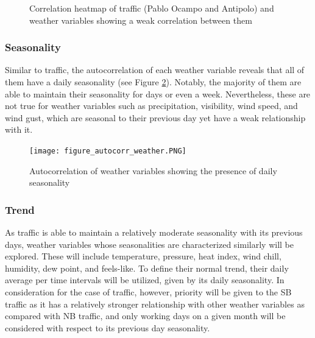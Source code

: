 \begin{figure}[!t]
  \centering
  \captionsetup{justification=centering}
  \caption{Correlation heatmap of traffic (Pablo Ocampo and Antipolo) and weather variables showing a weak correlation between them}
\label{figure_corr_trafficweather}
\end{figure}



\subsubsection{Seasonality}

Similar to traffic, the autocorrelation of each weather variable reveals that all of them have a daily seasonality (see Figure \ref{figure_autocorr_weather}). Notably, the majority of them are able to maintain their seasonality for days or even a week. Nevertheless, these are not true for weather variables such as precipitation, visibility, wind speed, and wind gust, which are seasonal to their previous day yet have a weak relationship with it.


\begin{figure}[!t]
  \centering
  \captionsetup{justification=centering}
  \texttt{[image: figure\_autocorr\_weather.PNG]}
  \caption{Autocorrelation of weather variables showing the presence of daily seasonality}
\label{figure_autocorr_weather}
\end{figure}


\subsubsection{Trend}

As traffic is able to maintain a relatively moderate seasonality with its previous days, weather variables whose seasonalities are characterized similarly will be explored. These will include temperature, pressure, heat index, wind chill, humidity, dew point, and feels-like. To define their normal trend, their daily average per time intervals will be utilized, given by its daily seasonality. In consideration for the case of traffic, however, priority will be given to the SB traffic as it has a relatively stronger relationship with other weather variables as compared with NB traffic, and only working days on a given month will be considered with respect to its previous day seasonality.

